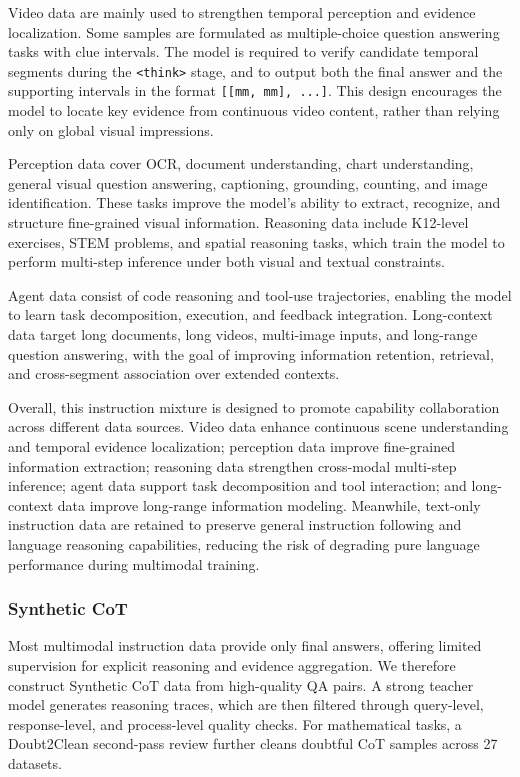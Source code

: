 \documentclass{llmxive}
\begin{document}
Video data are mainly used to strengthen temporal perception and evidence localization. Some samples are formulated as multiple-choice question answering tasks with clue intervals. The model is required to verify candidate temporal segments during the \texttt{\textless think\textgreater} stage, and to output both the final answer and the supporting intervals in the format \texttt{[[mm, mm], ...]}. This design encourages the model to locate key evidence from continuous video content, rather than relying only on global visual impressions.

Perception data cover OCR, document understanding, chart understanding, general visual question answering, captioning, grounding, counting, and image identification. These tasks improve the model's ability to extract, recognize, and structure fine-grained visual information. Reasoning data include K12-level exercises, STEM problems, and spatial reasoning tasks, which train the model to perform multi-step inference under both visual and textual constraints. 

Agent data consist of code reasoning and tool-use trajectories, enabling the model to learn task decomposition, execution, and feedback integration. Long-context data target long documents, long videos, multi-image inputs, and long-range question answering, with the goal of improving information retention, retrieval, and cross-segment association over extended contexts.

Overall, this instruction mixture is designed to promote capability collaboration across different data sources. Video data enhance continuous scene understanding and temporal evidence localization; perception data improve fine-grained information extraction; reasoning data strengthen cross-modal multi-step inference; agent data support task decomposition and tool interaction; and long-context data improve long-range information modeling. Meanwhile, text-only instruction data are retained to preserve general instruction following and language reasoning capabilities, reducing the risk of degrading pure language performance during multimodal training.

\subsubsection{Synthetic CoT}

Most multimodal instruction data provide only final answers, offering limited supervision for explicit reasoning and evidence aggregation. We therefore construct Synthetic CoT data from high-quality QA pairs. A strong teacher model generates reasoning traces, which are then filtered through query-level, response-level, and process-level quality checks. For mathematical tasks, a Doubt2Clean second-pass review further cleans doubtful CoT samples across 27 datasets.
\end{document}
